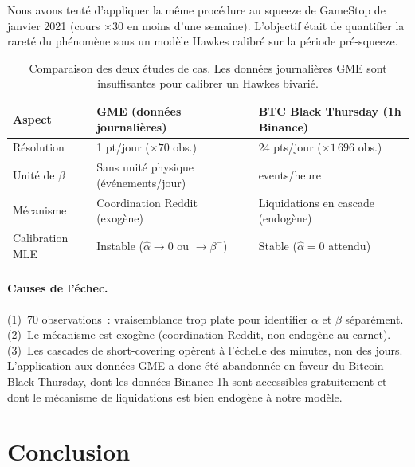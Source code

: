 \documentclass[11pt,a4paper]{article}
\theoremstyle{definition}
\begin{document}
\begin{resultatnegatif}[title={Données intraday insuffisantes — modélisation abandonnée}]
Nous avons tenté d'appliquer la même procédure au squeeze de GameStop de
janvier 2021 (cours $\times30$ en moins d'une semaine). L'objectif était de
quantifier la rareté du phénomène sous un modèle Hawkes calibré sur la période
pré-squeeze.
\end{resultatnegatif}

\begin{table}[H]
\centering\small
\begin{tabular}{@{}lll@{}}
\toprule
Aspect & GME (données journalières) & BTC Black Thursday (1h Binance) \\
\midrule
Résolution         & 1 pt/jour ($\times70$ obs.) & 24 pts/jour ($\times1\,696$ obs.) \\
Unité de $\beta$   & Sans unité physique (événements/jour) & events/heure \\
Mécanisme          & Coordination Reddit (exogène) & Liquidations en cascade (endogène) \\
Calibration MLE    & Instable ($\hat\alpha\to0$ ou $\to\beta^-$) & Stable ($\hat\alpha=0$ attendu) \\
\bottomrule
\end{tabular}
\caption{Comparaison des deux études de cas. Les données journalières GME sont insuffisantes pour calibrer un Hawkes bivarié.}
\label{tab:gme}
\end{table}

\paragraph{Causes de l'échec.}
(1)~70 observations~: vraisemblance trop plate pour identifier $\alpha$ et $\beta$
séparément. (2)~Le mécanisme est exogène (coordination Reddit, non endogène au carnet).
(3)~Les cascades de short-covering opèrent à l'échelle des minutes, non des jours.
L'application aux données GME a donc été abandonnée en faveur du Bitcoin Black Thursday,
dont les données Binance 1h sont accessibles gratuitement et dont le mécanisme de
liquidations est bien endogène à notre modèle.

\section*{Conclusion}
\end{document}
